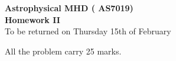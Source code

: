 \documentclass[a4paper,twoside,10pt]{article}
\begin{document}

\newenvironment{itmz}%
{ \vspace{-\parskip} \begin{itemize} }%
{ \end{itemize} }
\def\flux{{\cal F}_\nu}


\begin{center}
  {\Large \bf
   Astrophysical MHD ( AS7019)\\[2mm]
   Homework II} \\[4mm]
To be returned on Thursday 15th of February 
\end{center}
All the problem carry 25 marks.  
\bigskip

\end{document}
